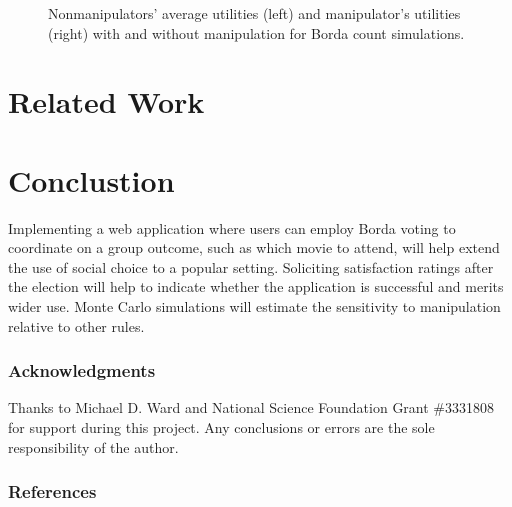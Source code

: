 \documentclass[12pt,letterpaper]{article} %
\begin{document}
\begin{center}
\begin{figure}[h!]
\begin{minipage}{0.45\textwidth}
\begin{center}
\end{center}
\end{minipage}
\caption{Nonmanipulators' average utilities (left) and manipulator's utilities (right) with and without manipulation for Borda count simulations.}
\label{nonmanip-manip-utils}
\end{figure}
\end{center}


\section{Related Work}

\section{Conclustion}

Implementing a web application where users can employ Borda voting to coordinate on a group outcome, such as which movie to attend, will help extend the use of social choice to a popular setting. Soliciting satisfaction ratings after the election will help to indicate whether the application is successful and merits wider use. Monte Carlo simulations will estimate the sensitivity to manipulation relative to other rules. 



\subsubsection*{Acknowledgments}

Thanks to Michael D. Ward and National Science Foundation Grant \#3331808 for support during this project. Any conclusions or errors are the sole responsibility of the author.

\newpage
\subsubsection*{References}



\begingroup
\renewcommand{\section}[2]{}


\endgroup
\end{document}
